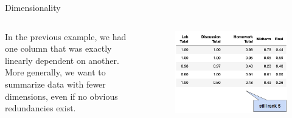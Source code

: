 \documentclass[aspectratio=169]{../latex_main/tntbeamer}  %
\begin{document}
	
	\begin{frame}{Dimensionality}
	    \begin{columns}
	        \begin{column}{.5\textwidth}
	               In the previous example, we had one column that was exactly linearly dependent on another.\\
	               \bigskip
	               More generally, we want to summarize data with fewer dimensions, even if no obvious redundancies exist.
	        \end{column}
	        
	        
	        \begin{column}{.5\textwidth}
	                \begin{figure}
	                    \centering
	                    \includegraphics[scale=.4]{Bild5}
	                \end{figure}
	        \end{column}
	    \end{columns}
	\end{frame}
	
\end{document}
